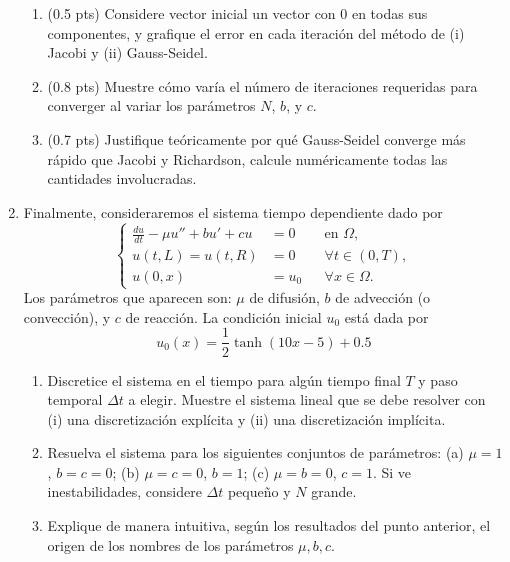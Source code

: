 \documentclass{article}
\begin{document}
\begin{enumerate}
    \begin{enumerate}
        \item (0.5 pts)  Considere vector inicial un vector con 0 en todas sus componentes, y grafique el error en cada iteración del método de (i) Jacobi y (ii) Gauss-Seidel.
        \item (0.8 pts) Muestre cómo varía el número de iteraciones requeridas para converger al variar los parámetros $N$, $b$, y $c$.
        \item (0.7 pts) Justifique teóricamente por qué Gauss-Seidel converge más rápido que Jacobi y Richardson, calcule numéricamente todas las cantidades involucradas.
    \end{enumerate}

\item Finalmente, consideraremos el sistema tiempo dependiente dado por
        $$
            \left\lbrace\begin{aligned}
                \frac{d u}{d t}- \mu u'' + b u' + c u &= 0 && \text{en $\Omega$},\\
                u(t, L) = u(t, R) &= 0 &&\forall t\in (0,T), \\ 
                u(0, x) &= u_0 &&\forall x\in \Omega.
            \end{aligned}\right.
        $$
Los parámetros que aparecen son: $\mu$ de difusión, $b$ de advección (o convección), y $c$ de reacción. La condición inicial $u_0$ está dada por    
        $$ u_0(x) = \frac 1 2 \tanh (10x - 5) + 0.5 $$

    \begin{enumerate}
        \item Discretice el sistema en el tiempo para algún tiempo final $T$ y paso temporal $\Delta t$ a elegir. Muestre el sistema lineal que se debe resolver con (i) una discretización explícita y (ii) una discretización implícita.
        \item Resuelva el sistema para los siguientes conjuntos de parámetros: (a) $\mu=1$, $b=c=0$; (b) $\mu=c=0$, $b=1$; (c) $\mu=b=0$, $c=1$. Si ve inestabilidades, considere $\Delta t$ pequeño y $N$ grande.
        \item Explique de manera intuitiva, según los resultados del punto anterior, el origen de los nombres de los parámetros $\mu,b,c$.
    \end{enumerate}
\end{enumerate}
\end{document}
